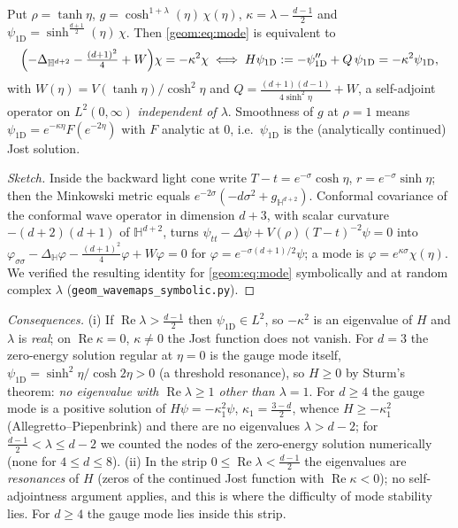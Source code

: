 \begin{proposition}\label{geom:prop:hyp}
Put $\rho=\tanh\eta$, $g=\cosh^{1+\lambda}(\eta)\,\chi(\eta)$,
$\kappa=\lambda-\frac{d-1}{2}$ and
$\psi_{\mathrm{1D}}=\sinh^{\frac{d+1}{2}}(\eta)\,\chi$. Then
\eqref{geom:eq:mode} is equivalent to
\begin{equation}\label{geom:eq:H}
  \Bigl(-\Delta_{\mathbb H^{d+2}}-\tfrac{(d+1)^2}{4}+W\Bigr)\chi=-\kappa^2\chi
  \iff
  H\psi_{\mathrm{1D}}:=-\psi_{\mathrm{1D}}''+Q\,\psi_{\mathrm{1D}}=-\kappa^2\psi_{\mathrm{1D}},
\end{equation}
with $W(\eta)=V(\tanh\eta)/\cosh^2\eta$ and
$Q=\frac{(d+1)(d-1)}{4\sinh^2\eta}+W$, a self-adjoint operator on
$L^2(0,\infty)$ \emph{independent of $\lambda$}. Smoothness of $g$ at
$\rho=1$ means $\psi_{\mathrm{1D}}=e^{-\kappa\eta}F(e^{-2\eta})$ with $F$
analytic at $0$, i.e.\ $\psi_{\mathrm{1D}}$ is the (analytically continued)
Jost solution.
\end{proposition}
\begin{proof}[Sketch]
Inside the backward light cone write $T-t=e^{-\sigma}\cosh\eta$,
$r=e^{-\sigma}\sinh\eta$; then the Minkowski metric equals
$e^{-2\sigma}(-d\sigma^2+g_{\mathbb H^{d+2}})$. Conformal covariance of the
conformal wave operator in dimension $d+3$, with scalar curvature
$-(d+2)(d+1)$ of $\mathbb H^{d+2}$, turns
$\psi_{tt}-\Delta\psi+V(\rho)(T-t)^{-2}\psi=0$ into
$\varphi_{\sigma\sigma}-\Delta_{\mathbb H}\varphi-\frac{(d+1)^2}{4}\varphi+W\varphi=0$
for $\varphi=e^{-\sigma(d+1)/2}\psi$; a mode is $\varphi=e^{\kappa\sigma}\chi(\eta)$.
We verified the resulting identity for \eqref{geom:eq:mode} symbolically and
at random complex $\lambda$ (\texttt{geom\_wavemaps\_symbolic.py}).
\end{proof}
\noindent\emph{Consequences.} (i) If $\operatorname{Re}\lambda>\frac{d-1}{2}$
then $\psi_{\mathrm{1D}}\in L^2$, so $-\kappa^2$ is an eigenvalue of $H$ and
$\lambda$ is \emph{real}; on $\operatorname{Re}\kappa=0$, $\kappa\neq0$ the Jost
function does not vanish. For $d=3$ the zero-energy solution regular at
$\eta=0$ is the gauge mode itself,
$\psi_{\mathrm{1D}}=\sinh^2\eta/\cosh2\eta>0$ (a threshold resonance), so
$H\ge0$ by Sturm's theorem: \emph{no eigenvalue with $\operatorname{Re}\lambda\ge1$
other than $\lambda=1$}. For $d\ge4$ the gauge mode is a positive solution of
$H\psi=-\kappa_1^2\psi$, $\kappa_1=\frac{3-d}{2}$, whence $H\ge-\kappa_1^2$
(Allegretto--Piepenbrink) and there are no eigenvalues $\lambda>d-2$; for
$\frac{d-1}{2}<\lambda\le d-2$ we counted the nodes of the zero-energy
solution numerically (none for $4\le d\le8$). (ii) In the strip
$0\le\operatorname{Re}\lambda<\frac{d-1}{2}$ the eigenvalues are
\emph{resonances} of $H$ (zeros of the continued Jost function with
$\operatorname{Re}\kappa<0$); no self-adjointness argument applies, and this is
where the difficulty of mode stability lies. For $d\ge4$ the gauge mode lies
inside this strip.

